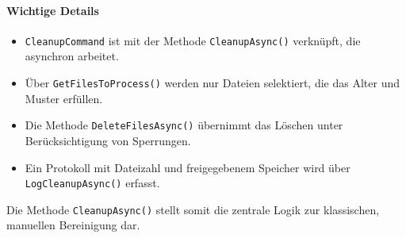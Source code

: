 
\paragraph{Wichtige Details}
\begin{itemize}
  \item \texttt{CleanupCommand} ist mit der Methode \texttt{CleanupAsync()} verknüpft, die asynchron arbeitet.
  \item Über \texttt{GetFilesToProcess()} werden nur Dateien selektiert, die das Alter und Muster erfüllen.
  \item Die Methode \texttt{DeleteFilesAsync()} übernimmt das Löschen unter Berücksichtigung von Sperrungen.
  \item Ein Protokoll mit Dateizahl und freigegebenem Speicher wird über \texttt{LogCleanupAsync()} erfasst.
\end{itemize}

Die Methode \texttt{CleanupAsync()} stellt somit die zentrale Logik zur klassischen, manuellen Bereinigung dar.
